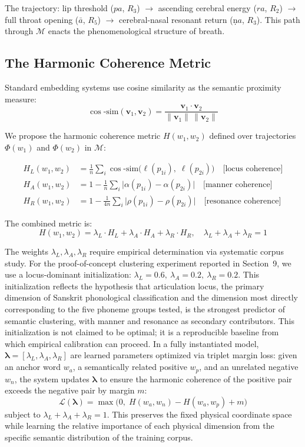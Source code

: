 \documentclass[12pt]{article}
\begin{document}
The trajectory: lip threshold ($pa$, $R_3$) $\to$ ascending cerebral energy ($ra$, $R_2$) $\to$ full throat opening ($\bar{a}$, $R_5$) $\to$ cerebral-nasal resonant return (\d{n}$a$, $R_3$). This path through $\mathcal{M}$ enacts the phenomenological structure of breath.

\subsection{The Harmonic Coherence Metric}

Standard embedding systems use cosine similarity as the semantic proximity measure:
\[
\cos\text{-sim}(\mathbf{v}_1, \mathbf{v}_2) = \frac{\mathbf{v}_1 \cdot \mathbf{v}_2}{\|\mathbf{v}_1\|\,\|\mathbf{v}_2\|}
\]

We propose the harmonic coherence metric $H(w_1, w_2)$ defined over trajectories $\Phi(w_1)$ and $\Phi(w_2)$ in $\mathcal{M}$:

\begin{align}
H_L(w_1, w_2) &= \frac{1}{n}\sum_i \cos\text{-sim}\bigl(\ell(p_{1i}),\; \ell(p_{2i})\bigr) \quad\text{[locus coherence]} \\[4pt]
H_A(w_1, w_2) &= 1 - \frac{1}{n}\sum_i \bigl|\alpha(p_{1i}) - \alpha(p_{2i})\bigr| \quad\text{[manner coherence]} \\[4pt]
H_R(w_1, w_2) &= 1 - \frac{1}{4n}\sum_i \bigl|\rho(p_{1i}) - \rho(p_{2i})\bigr| \quad\text{[resonance coherence]}
\end{align}

The combined metric is:
\[
H(w_1, w_2) = \lambda_L \cdot H_L + \lambda_A \cdot H_A + \lambda_R \cdot H_R, \quad \lambda_L + \lambda_A + \lambda_R = 1
\]

The weights $\lambda_L, \lambda_A, \lambda_R$ require empirical determination via systematic corpus study. For the proof-of-concept clustering experiment reported in Section~9, we use a locus-dominant initialization: $\lambda_L = 0.6,\ \lambda_A = 0.2,\ \lambda_R = 0.2$. This initialization reflects the hypothesis that articulation locus, the primary dimension of Sanskrit phonological classification and the dimension most directly corresponding to the five phoneme groups tested, is the strongest predictor of semantic clustering, with manner and resonance as secondary contributors. This initialization is not claimed to be optimal; it is a reproducible baseline from which empirical calibration can proceed. In a fully instantiated model, $\boldsymbol{\lambda} = [\lambda_L, \lambda_A, \lambda_R]$ are learned parameters optimized via triplet margin loss: given an anchor word $w_a$, a semantically related positive $w_p$, and an unrelated negative $w_n$, the system updates $\boldsymbol{\lambda}$ to ensure the harmonic coherence of the positive pair exceeds the negative pair by margin $m$:
\[
\mathcal{L}(\boldsymbol{\lambda}) = \max\bigl(0,\; H(w_a, w_n) - H(w_a, w_p) + m\bigr)
\]
subject to $\lambda_L + \lambda_A + \lambda_R = 1$. This preserves the fixed physical coordinate space while learning the relative importance of each physical dimension from the specific semantic distribution of the training corpus.
\end{document}
